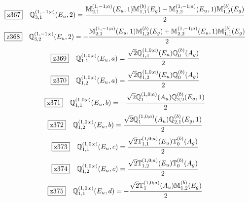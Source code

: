 \documentclass[fleqn,10pt,landscape]{jsarticle}
\begin{document}
\begin{dmath*}
\hspace*{3mm}\fbox{z367}\quad \mathbb{Q}_{3,1}^{(1,-1;c)}(E_{u},2)=\frac{\mathbb{M}_{2,1}^{(1,-1;a)}(E_{u},1) \mathbb{M}_{1,1}^{(b)}(E_{g}) - \mathbb{M}_{2,2}^{(1,-1;a)}(E_{u},1) \mathbb{M}_{1,2}^{(b)}(E_{g})}{2}
\end{dmath*}
\begin{dmath*}
\hspace*{3mm}\fbox{z368}\quad \mathbb{Q}_{3,2}^{(1,-1;c)}(E_{u},2)=- \frac{\mathbb{M}_{2,1}^{(1,-1;a)}(E_{u},1) \mathbb{M}_{1,2}^{(b)}(E_{g}) + \mathbb{M}_{2,2}^{(1,-1;a)}(E_{u},1) \mathbb{M}_{1,1}^{(b)}(E_{g})}{2}
\end{dmath*}
\begin{dmath*}
\hspace*{3mm}\fbox{z369}\quad \mathbb{Q}_{1,1}^{(1,0;c)}(E_{u},a)=\frac{\sqrt{2} \mathbb{Q}_{1,1}^{(1,0;a)}(E_{u}) \mathbb{Q}_{0}^{(b)}(A_{g})}{2}
\end{dmath*}
\begin{dmath*}
\hspace*{3mm}\fbox{z370}\quad \mathbb{Q}_{1,2}^{(1,0;c)}(E_{u},a)=\frac{\sqrt{2} \mathbb{Q}_{1,2}^{(1,0;a)}(E_{u}) \mathbb{Q}_{0}^{(b)}(A_{g})}{2}
\end{dmath*}
\begin{dmath*}
\hspace*{3mm}\fbox{z371}\quad \mathbb{Q}_{1,1}^{(1,0;c)}(E_{u},b)=- \frac{\sqrt{2} \mathbb{Q}_{1}^{(1,0;a)}(A_{u}) \mathbb{Q}_{2,2}^{(b)}(E_{g},1)}{2}
\end{dmath*}
\begin{dmath*}
\hspace*{3mm}\fbox{z372}\quad \mathbb{Q}_{1,2}^{(1,0;c)}(E_{u},b)=\frac{\sqrt{2} \mathbb{Q}_{1}^{(1,0;a)}(A_{u}) \mathbb{Q}_{2,1}^{(b)}(E_{g},1)}{2}
\end{dmath*}
\begin{dmath*}
\hspace*{3mm}\fbox{z373}\quad \mathbb{Q}_{1,1}^{(1,0;c)}(E_{u},c)=\frac{\sqrt{2} \mathbb{T}_{1,1}^{(1,0;a)}(E_{u}) \mathbb{T}_{0}^{(b)}(A_{g})}{2}
\end{dmath*}
\begin{dmath*}
\hspace*{3mm}\fbox{z374}\quad \mathbb{Q}_{1,2}^{(1,0;c)}(E_{u},c)=\frac{\sqrt{2} \mathbb{T}_{1,2}^{(1,0;a)}(E_{u}) \mathbb{T}_{0}^{(b)}(A_{g})}{2}
\end{dmath*}
\begin{dmath*}
\hspace*{3mm}\fbox{z375}\quad \mathbb{Q}_{1,1}^{(1,0;c)}(E_{u},d)=- \frac{\sqrt{2} \mathbb{T}_{1}^{(1,0;a)}(A_{u}) \mathbb{M}_{1,2}^{(b)}(E_{g})}{2}
\end{dmath*}
\end{document}
